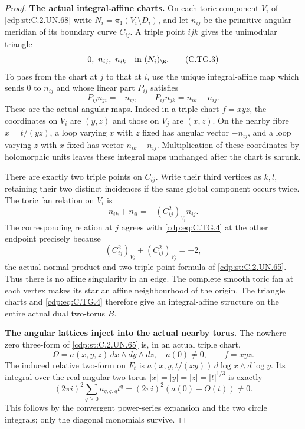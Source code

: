 \begin{proof}
\par\medskip\noindent\textbf{The actual integral-affine charts.}
On each toric component $V_i$ of \ref{cdp:st:C.2.UN.68} write
$N_i=\pi_1(V_i\setminus D_i)$, and let $n_{ij}$
be the primitive angular meridian of its boundary
curve $C_{ij}$. A triple point $ijk$ gives the
unimodular triangle
\[
                 0,\ n_{ij},\ n_{ik}\quad\hbox{in }(N_i)_{\R}.
\tag{C.TG.3}\label{cdp:eq:C.TG.3}
\]
To pass from the chart at $j$ to that at $i$,
use the unique integral-affine map which sends
$0$ to $n_{ij}$ and whose linear part $P_{ij}$ satisfies
\[
 P_{ij}n_{ji}=-n_{ij},\qquad
 P_{ij}n_{jk}=n_{ik}-n_{ij}.
\tag{C.TG.4}\label{cdp:eq:C.TG.4}
\]
These are the actual angular maps. Indeed in a
triple chart $f=xyz$, the coordinates on $V_i$
are $(y,z)$ and those on $V_j$ are $(x,z)$.
On the nearby fibre $x=t/(yz)$, a loop varying
$x$ with $z$ fixed has angular vector $-n_{ij}$,
and a loop varying $z$ with $x$ fixed has vector
$n_{ik}-n_{ij}$. Multiplication of these coordinates
by holomorphic units leaves these integral maps
unchanged after the chart is shrunk.

There are exactly two triple points on $C_{ij}$.
Write their third vertices as $k,l$, retaining
their two distinct incidences if the same global
component occurs twice. The toric fan relation on
$V_i$ is
\[
 n_{ik}+n_{il}=-(C_{ij}^2)_{V_i}n_{ij}.
\tag{C.TG.5}\label{cdp:eq:C.TG.5}
\]
The corresponding relation at $j$ agrees with
\eqref{cdp:eq:C.TG.4} at the other endpoint precisely because
\[
             (C_{ij}^2)_{V_i}+(C_{ij}^2)_{V_j}=-2,
\tag{C.TG.6}\label{cdp:eq:C.TG.6}
\]
the actual normal-product and two-triple-point
formula of \ref{cdp:st:C.2.UN.65}. Thus there is no affine singularity
in an edge. The complete smooth toric fan at each
vertex makes its star an affine neighbourhood of
the origin. The triangle charts and \eqref{cdp:eq:C.TG.4}
therefore give an integral-affine structure on
the entire actual dual two-torus $B$.

\par\medskip\noindent\textbf{The angular lattices inject into the actual nearby torus.}
The nowhere-zero three-form of \ref{cdp:st:C.2.UN.65} is, in an
actual triple chart,
\[
       \Omega=a(x,y,z)\,dx\wedge dy\wedge dz,
          \quad a(0)\ne0,
          \qquad f=xyz.
\tag{C.TG.7}\label{cdp:eq:C.TG.7}
\]
The induced relative two-form on $F_t$ is
$a(x,y,t/(xy))\,d\log x\wedge d\log y$.
Its integral over the real angular two-torus
$|x|=|y|=|z|=|t|^{1/3}$ is exactly
\[
 (2\pi i)^2\sum_{q\ge0}a_{q,q,q}t^q
                  =(2\pi i)^2(a(0)+O(t))\ne0.
\tag{C.TG.8}\label{cdp:eq:C.TG.8}
\]
This follows by the convergent power-series expansion
and the two circle integrals; only the diagonal
monomials survive.


\end{proof}
